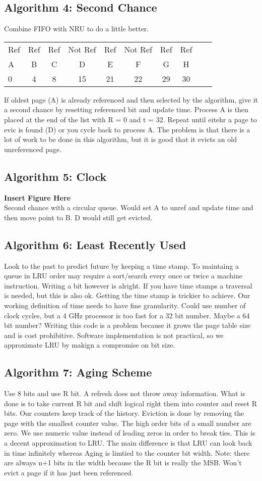 \documentclass[../base_file/cs1550_notes.tex]{subfiles}
\begin{document}
\subsection{Algorithm 4: Second Chance}
Combine FIFO with NRU to do a little better.
\begin{center}
\begin{tabular}{l*{8}{c}r}
Ref & Ref & Ref & Not Ref & Ref & Not Ref & Ref & Ref\\
A & B & C & D & E & F & G & H\\
0 & 4 & 8 & 15 & 21 & 22 & 29 & 30\\
\end{tabular}
\end{center}
If oldest page (A) is already referenced and then selected by the algorithm, give it a second chance by resetting referenced bit and update
time.  Process A is then placed at the end of the list with R = 0 and t = 32.  Repeat until eitehr a page to evic is found (D) or you cycle
back to process A.  The problem is that there is a lot of work to be done in this algorithm, but it is good that it evicts an old unreferenced
page.  
\subsection{Algorithm 5: Clock}
\textbf{Insert Figure Here}\\
Second chance with a circular queue.  Would set A to unref and update time and then move point to B.  D would still get evicted.
\subsection{Algorithm 6: Least Recently Used}
Look to the past to predict future by keeping a time stamp.  To maintaing a queue in LRU order may require a sort/search every once or twice 
a machine instruction.  Writing a bit however is alright.  If you have time stamps a traversal is needed, but this is also ok. Getting the
time stamp is trickier to achieve.  Our working definition of time needs to have fine granularity.  Could use number of clock cycles, but a 
4 GHz processor is too fast for a 32 bit number.  Maybe a 64 bit number?  Writing this code is a problem because it grows the page table size
and is cost prohibitive.  Software implementation is not practical, so we approximate LRU by makign a compromise on bit size.
\subsection{Algorithm 7: Aging Scheme}
Use 8 bits and use R bit.  A refresh does not throw away information.  What is done is to take current R bit and shift logical right them
into counter and reset R bits.  Our counters keep track of the history.  Eviction is done by removing the page with the smallest counter value.
The high order bits of a small number are zero.  We use numeric value instead of leading zeros in order to break ties.
This is a decent approximation to LRU\@.  The 
main difference is that LRU can look back in time infinitely whereas Aging is limtied to the counter bit width.  Note: there are always n+1 bits
in the width because the R bit is really the MSB\@.  Won't evict a page if it has just been referenced.
\end{document}
